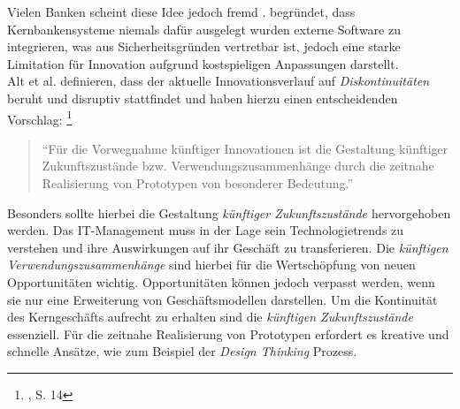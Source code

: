 Vielen Banken scheint diese Idee jedoch fremd \cite{Eismann2015}.
\citet{Eismann2015} begründet, dass Kernbankensysteme niemals dafür ausgelegt wurden externe Software zu integrieren, was aus Sicherheitsgründen vertretbar ist, jedoch eine starke Limitation für Innovation aufgrund kostspieligen Anpassungen darstellt.
\medskip
\\
Alt et al. \cite{Alt2017} definieren, dass der aktuelle Innovationsverlauf auf \emph{Diskontinuitäten} beruht und disruptiv stattfindet und haben hierzu einen entscheidenden Vorschlag: \footnote{\citet{Alt2017}, S. 14}
\begin{quote}
\enquote{Für die Vorwegnahme künftiger Innovationen ist die Gestaltung künftiger
Zukunftszustände bzw. Verwendungszusammenhänge durch die zeitnahe Realisierung von Prototypen von besonderer Bedeutung.}
\end{quote}
Besonders sollte hierbei die Gestaltung \emph{künftiger Zukunftszustände \cite{Alt2017}} hervorgehoben werden. Das IT-Management muss in der Lage sein Technologietrends zu verstehen und ihre Auswirkungen auf ihr Geschäft zu transferieren. Die \emph{künftigen Verwendungszusammenhänge} sind hierbei für die Wertschöpfung von neuen Opportunitäten wichtig. Opportunitäten können jedoch verpasst werden, wenn sie nur eine Erweiterung von Geschäftsmodellen darstellen. Um die Kontinuität des Kerngeschäfts aufrecht zu erhalten sind die \emph{künftigen Zukunftszustände \cite{Alt2017}} essenziell. Für die zeitnahe Realisierung von Prototypen erfordert es kreative \cite{Alt2017} und schnelle Ansätze, wie zum Beispiel der \emph{Design Thinking} Prozess.

